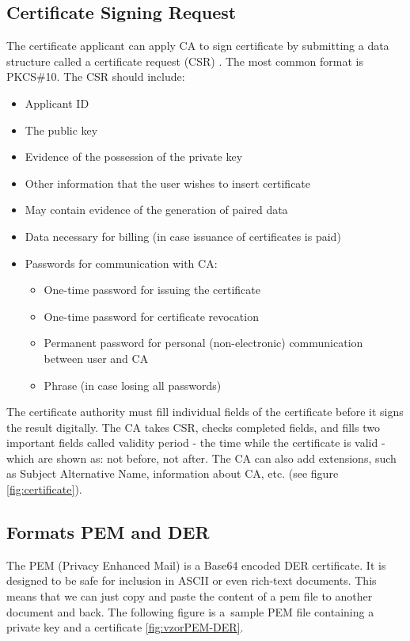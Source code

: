 \documentclass[
  twoside, 12pt, 
  printed, %
  notable,   %
  lof,     %
  lot,     %
]{fithesis3}
\begin{document}
\subsection{Certificate Signing Request}
The certificate applicant can apply CA to sign certificate by submitting a data structure called 
a certificate request (CSR) \cite{dostalek2016velky}. The most common format is PKCS\#10. The CSR 
should include:
\begin{itemize}[leftmargin=2em,rightmargin=1em,itemsep=0.75\parskip,parsep=0em,topsep=0em,partopsep=0em]
\item Applicant ID
\item The public key
\item Evidence of the possession of the private key
\item Other information that the user wishes to insert certificate
\item May contain evidence of the generation of paired data
\item Data necessary for billing (in case issuance of certificates is paid)
\item Passwords for communication with CA:
  \begin{itemize}[leftmargin=2em,rightmargin=1em,itemsep=0.75\parskip,parsep=0em,topsep=0em,partopsep=0em]
  \item One-time password for issuing the certificate
  \item One-time password for certificate revocation
  \item Permanent password for personal (non-electronic) communication between user and CA
  \item Phrase (in case losing all passwords) 
  \end{itemize}
\end{itemize} 

The certificate authority must fill individual fields of the certificate before it signs the 
result digitally. The CA takes CSR, checks completed fields, and fills two important fields 
called validity period - the time while the certificate is valid - which are shown as: not 
before, not after. The CA can also add extensions, such as Subject Alternative Name, information 
about CA, etc. (see figure \ref{fig:certificate}).

\subsection{Formats PEM and DER}
The PEM (Privacy Enhanced Mail) is a Base64 encoded DER certificate. It is designed 
to be safe for inclusion in ASCII or even rich-text documents. This means that we can just copy 
and paste the content of a pem file to another document and back. The following figure is a~sample 
PEM file containing a private key and a certificate \ref{fig:vzorPEM-DER}.
\end{document}
